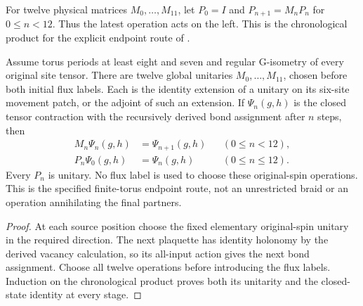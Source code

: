 \begin{definition}%
    \label{def:peps_torus_swept_physical_route_composition}
    \leanok
    For twelve physical matrices $M_0,\ldots,M_{11}$, let $P_0=I$ and
    $P_{n+1}=M_nP_n$ for $0\leq n<12$. Thus the latest operation acts
    on the left. This is the chronological product for the explicit
    endpoint route of \cite[\S6.6, local lines 2340--2423]{Schuch2010PEPS}.
\end{definition}

\begin{lemma}%
    \label{thm:peps_torus_swept_physical_route_composition}
    \leanok
    Assume torus periods at least eight and seven and regular
    G-isometry of every original site tensor. There are twelve global
    unitaries $M_0,\ldots,M_{11}$, chosen before both initial flux labels.
    Each is the identity extension of a unitary on its six-site
    movement patch, or the adjoint of such an extension.
    If $\Psi_n(g,h)$ is the closed tensor contraction with the
    recursively derived bond assignment after $n$ steps, then
    \begin{align}
        M_n\Psi_n(g,h) & =\Psi_{n+1}(g,h) &  & (0\leq n<12),    \\
        P_n\Psi_0(g,h) & =\Psi_n(g,h)     &  & (0\leq n\leq12).
    \end{align}
    Every $P_n$ is unitary. No flux label is used to choose these
    original-spin operations. This is the specified finite-torus
    endpoint route, not an unrestricted braid or an operation
    annihilating the final partners.
\end{lemma}

\begin{proof}\leanok
    At each source position choose the fixed elementary original-spin
    unitary in the required direction. The next plaquette has
    identity holonomy by the derived vacancy calculation, so its
    all-input action gives the next bond assignment. Choose all
    twelve operations before introducing the flux labels. Induction
    on the chronological product proves both its unitarity and the
    closed-state identity at every stage.
\end{proof}

